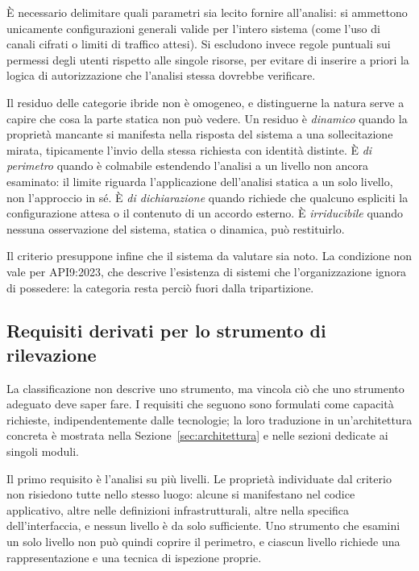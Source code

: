 È necessario delimitare quali parametri sia lecito fornire all'analisi:
si ammettono unicamente configurazioni generali valide per l'intero sistema
(come l'uso di canali cifrati o limiti di traffico attesi). Si escludono
invece regole puntuali sui permessi degli utenti rispetto alle singole
risorse, per evitare di inserire a priori la logica di autorizzazione che
l'analisi stessa dovrebbe verificare.

Il residuo delle categorie ibride non è omogeneo, e distinguerne la natura
serve a capire che cosa la parte statica non può vedere. Un residuo è \emph{dinamico} quando la proprietà
mancante si manifesta nella risposta del sistema a una sollecitazione mirata,
tipicamente l'invio della stessa richiesta con identità distinte. È \emph{di
perimetro} quando è colmabile estendendo l'analisi a un livello non
ancora esaminato: il limite riguarda l'applicazione dell'analisi statica a un
solo livello, non l'approccio in sé. È \emph{di dichiarazione} quando
richiede che qualcuno espliciti la configurazione attesa o il contenuto di un
accordo esterno. È \emph{irriducibile} quando nessuna osservazione del
sistema, statica o dinamica, può restituirlo.

Il criterio presuppone infine che il sistema da valutare sia noto. La
condizione non vale per API9:2023, che descrive l'esistenza di sistemi che
l'organizzazione ignora di possedere: la categoria resta perciò fuori dalla
tripartizione.

\subsection{Requisiti derivati per lo strumento di rilevazione}
\label{sec:requisiti}

La classificazione non descrive uno strumento, ma vincola ciò che uno
strumento adeguato deve saper fare. I requisiti che seguono sono formulati
come capacità richieste, indipendentemente dalle tecnologie; la loro
traduzione in un'architettura concreta è mostrata nella
Sezione~\ref{sec:architettura} e nelle sezioni dedicate ai singoli moduli.

Il primo requisito è l'analisi su più livelli. Le proprietà individuate dal
criterio non risiedono tutte nello stesso luogo: alcune si manifestano nel
codice applicativo, altre nelle definizioni infrastrutturali, altre nella
specifica dell'interfaccia, e nessun livello è da solo sufficiente. Uno
strumento che esamini un solo livello non può quindi coprire il
perimetro, e ciascun livello richiede una rappresentazione e una tecnica di
ispezione proprie.

